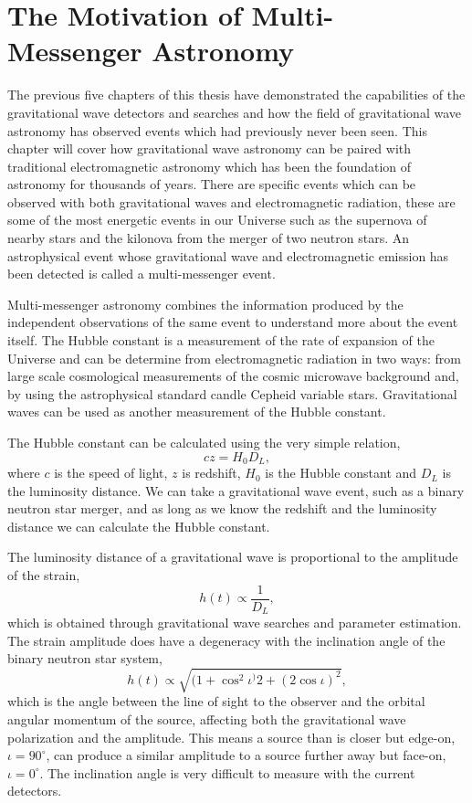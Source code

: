 \section{The Motivation of Multi-Messenger Astronomy}

The previous five chapters of this thesis have demonstrated the capabilities of the gravitational wave detectors and searches and how the field of gravitational wave astronomy has observed events which had previously never been seen. This chapter will cover how gravitational wave astronomy can be paired with traditional electromagnetic astronomy which has been the foundation of astronomy for thousands of years. There are specific events which can be observed with both gravitational waves and electromagnetic radiation, these are some of the most energetic events in our Universe such as the supernova of nearby stars and the kilonova from the merger of two neutron stars. An astrophysical event whose gravitational wave and electromagnetic emission has been detected is called a multi-messenger event.

Multi-messenger astronomy combines the information produced by the independent observations of the same event to understand more about the event itself. The Hubble constant is a measurement of the rate of expansion of the Universe and can be determine from electromagnetic radiation in two ways: from large scale cosmological measurements of the cosmic microwave background and, by using the astrophysical standard candle Cepheid variable stars. Gravitational waves can be used as another measurement of the Hubble constant.

The Hubble constant can be calculated using the very simple relation,
%
\begin{equation}
    cz = H_{0} D_{L}, 
\end{equation}
%
where $c$ is the speed of light, $z$ is redshift, $H_{0}$ is the Hubble constant and $D_{L}$ is the luminosity distance. We can take a gravitational wave event, such as a binary neutron star merger, and as long as we know the redshift and the luminosity distance we can calculate the Hubble constant.

The luminosity distance of a gravitational wave is proportional to the amplitude of the strain,
\begin{equation}
    h(t) \propto \frac{1}{D_{L}} , 
\end{equation}
which is obtained through gravitational wave searches and parameter estimation. The strain amplitude does have a degeneracy with the inclination angle of the binary neutron star system,
\begin{equation}
    h(t) \propto \sqrt{(1+\cos^{2}\iota^){2} + (2\cos\iota)^{2}},
\end{equation}
which is the angle between the line of sight to the observer and the orbital angular momentum of the source, affecting both the gravitational wave polarization and the amplitude. This means a source than is closer but edge-on, $\iota = 90^{\circ}$, can produce a similar amplitude to a source further away but face-on, $\iota = 0^{\circ}$. The inclination angle is very difficult to measure with the current detectors.


